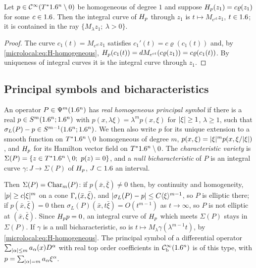 \begin{lemma}\label{microlocal:lem:radial}
  Let $p\in\mathcal{C}^\infty(T^*1.6^n\setminus0)$ be homogeneous of degree $1$ and suppose
  $H_{p}(z_1)=c\varrho(z_1)$ for some $c\in1.6$. Then the integral curve of
  $H_{p}$ through $z_1$ is $t\mapsto M_{e^{ct}}z_1$, $t\in1.6$; it is contained in
  the ray $\{M_\lambda z_1;\ \lambda>0\}$.
\end{lemma}
\begin{proof}
  The curve $c_1(t)=M_{e^{ct}}z_1$ satisfies $c_1'(t)=c\varrho(c_1(t))$ and, by
  \eqref{microlocal:eq:H-homogeneous},
  $H_{p}(c_1(t))=dM_{e^{ct}}(c\varrho(z_1))=c\varrho(c_1(t))$. By uniqueness of
  integral curves it is the integral curve through $z_1$.
\end{proof}

\subsection{Principal symbols and bicharacteristics}

\begin{definition}\label{microlocal:def:real-principal}
  An operator $P\in\Psi^{m}(1.6^n)$ has \emph{real homogeneous principal
  symbol} if there is a real $p\in S^m(1.6^n;1.6^n)$ with
  $p(x,\lambda\xi)=\lambda^mp(x,\xi)$ for $\lvert \xi\rvert\ge1$, $\lambda\ge1$, such that
  $\sigma_L(P)-p\in S^{m-1}(1.6^n;1.6^n)$. We then also write $p$ for its
  unique extension to a smooth function on $T^*1.6^n\setminus0$ homogeneous of degree
  $m$, $p(x,\xi)=\lvert \xi\rvert^mp(x,\xi/\lvert \xi\rvert)$, and $H_{p}$ for its Hamilton
  vector field on $T^*1.6^n\setminus0$. The \emph{characteristic variety} is
  $\Sigma(P)=\{z\in T^*1.6^n\setminus0;\ p(z)=0\}$, and a \emph{null bicharacteristic} of $P$
  is an integral curve $\gamma:J\to\Sigma(P)$ of $H_{p}$, $J\subset1.6$ an
  interval.
\end{definition}

Then $\Sigma(P)=\operatorname{Char}_m(P)$: if $p(\bar x,\bar\xi)\ne0$ then, by continuity and
homogeneity, $\lvert p\rvert\ge c\lvert \xi\rvert^m$ on a cone $\Gamma_\epsilon(\bar x,\bar\xi)$, and
$\lvert \sigma_L(P)-p\rvert\le C\langle \xi\rangle^{m-1}$, so $P$ is elliptic there; if
$p(\bar x,\bar\xi)=0$ then $\sigma_L(P)(\bar x,t\bar\xi)=O(t^{m-1})$ as
$t\to\infty$, so $P$ is not elliptic at $(\bar x,\bar\xi)$. Since $H_{p}p=0$,
an integral curve of $H_{p}$ which meets $\Sigma(P)$ stays in $\Sigma(P)$. If
$\gamma$ is a null bicharacteristic, so is $t\mapsto M_\lambda\gamma(\lambda^{m-1}t)$, by
\eqref{microlocal:eq:H-homogeneous}. The principal symbol of a differential
operator $\sum_{\lvert \alpha\rvert\le m}a_\alpha(x)D^\alpha$ with real top order
coefficients in $\mathcal{C}^\infty_{\mathrm{b}}(1.6^n)$ is of this type, with $p=\sum_{\lvert \alpha\rvert=m}a_\alpha\xi^\alpha$.

